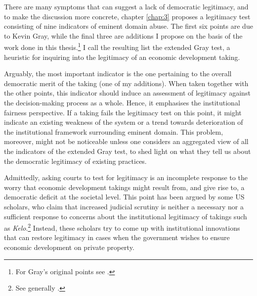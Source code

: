 
There are many symptoms that can suggest a lack of democratic legitimacy, and to make the discussion more concrete, chapter \ref{chap:3} proposes a legitimacy test consisting of nine indicators of eminent domain abuse. The first six points are due to Kevin Gray, while the final three are additions I propose on the basis of the work done in this thesis.\footnote{For Gray's original points see \cite{gray11}.} I call the resulting list the extended Gray test, a heuristic for inquiring into the legitimacy of an economic development taking. 

Arguably, the most important indicator is the one pertaining to the overall democratic merit of the taking (one of my additions). When taken together with the other points, this indicator should induce an assessment of legitimacy against the decision-making process as a whole. Hence, it emphasises the institutional fairness perspective. If a taking fails the legitimacy test on this point, it might indicate an existing weakness of the system or a trend towards deterioration of the institutional framework surrounding eminent domain. This problem, moreover, might not be noticeable unless one considers an aggregated view of all the indicators of the extended Gray test, to shed light on what they tell us about the democratic legitimacy of existing practices.

Admittedly, asking courts to test for legitimacy is an incomplete response to the worry that economic development takings might result from, and give rise to, a democratic deficit at the societal level. This point has been argued by some US scholars, who claim that increased judicial scrutiny is neither a necessary nor a sufficient response to concerns about the institutional legitimacy of takings such as {\it Kelo}.\footnote{See generally \cite{lehavi07,heller08}.} Instead, these scholars try to come up with institutional innovations that can restore legitimacy in cases when the government wishes to ensure economic development on private property.


